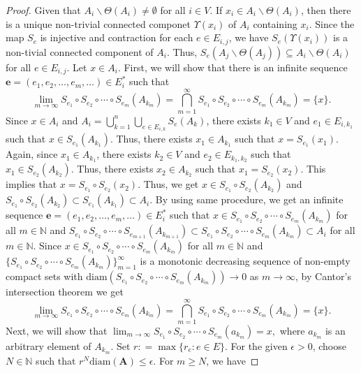\documentclass[a4paper,12pt,reqno]{amsart}
\numberwithin{equation}{section}
\theoremstyle{definition}
\theoremstyle{remark}
\numberwithin{equation}{section}
\begin{document}
\begin{proof}
Given that $A_i \backslash \Theta (A_i) \neq \emptyset$ for all $i\in V$. If $x_i \in A_i \backslash \Theta (A_i)$, then there is a unique non-trivial connected componet $\Upsilon(x_i)$ of $A_{i}$ containing $x_{i}.$ Since the map $S_{e}$ is injective and contraction for each $e\in E_{i,j}$, we have $S_e(\Upsilon(x_i))$ is a non-tivial connected component of $A_i$. Thus, $S_e(A_j \backslash \Theta (A_j))\subseteq A_i \backslash \Theta (A_i)$ for all $e\in E_{i,j}.$ Let $x\in A_i.$ First, we will show that there is an infinite sequence $\mathbf{e}=(e_1,e_2,\dots,e_m,\dots)\in E_{i}^*$ such that $$ \lim_{ m \to \infty} S_{e_1} \circ S_{e_2}\circ \cdots  \circ S_{e_m}(A_{k_m})=\bigcap_{m=1}^{\infty} S_{e_1} \circ S_{e_2}\circ \cdots  \circ S_{e_m}(A_{k_m})= \{x\}.$$ Since $x\in A_{i}$ and  $A_i=\bigcup_{k=1}^n \bigcup_{e \in E_{i,k}} S_e (A_k)$, there exists $k_{1}\in V$ and $e_{1}\in E_{i,k_1}$ such that $x\in S_{e_1}(A_{k_1}).$ Thus, there exists $x_1\in A_{k_1}$ such that $x=S_{e_1}(x_1).$ Again, since $x_1\in A_{k_1}$, there exists $k_{2}\in V$ and $e_{2}\in E_{k_1,k_2}$ such that $x_{1}\in S_{e_2}(A_{k_2}).$ Thus, there exists $x_2\in A_{k_2}$ such that $x_{1}=S_{e_2}(x_2).$ This implies that $x=S_{e_1}\circ S_{e_{2}}(x_2)$. Thus, we get $x\in S_{e_1}\circ S_{e_{2}} (A_{k_2})$ and $S_{e_1}\circ S_{e_{2}} (A_{k_2})\subset S_{e_1}(A_{k_1})\subset A_i$. By using same procedure, we get an infinite sequence $\mathbf{e}=(e_1,e_2,\dots,e_m,\dots)\in E_{i}^*$ such that $x\in S_{e_1} \circ S_{e_2}\circ \cdots  \circ S_{e_m}(A_{k_m})$ for all $m\in \mathbb{N}$ and $S_{e_1} \circ S_{e_2}\circ \cdots  \circ S_{e_{m+1}}(A_{k_{m+1}})\subset S_{e_1} \circ S_{e_2}\circ \cdots  \circ S_{e_m}(A_{k_m})\subset A_i$ for all $m\in \mathbb{N}.$ Since $x\in S_{e_1} \circ S_{e_2}\circ \cdots  \circ S_{e_m}(A_{k_m})$ for all $m\in \mathbb{N}$ and $\{S_{e_1} \circ S_{e_2}\circ \cdots  \circ S_{e_m}(A_{k_m})\}_{m=1}^{\infty}$ is a monotonic decreasing sequence of non-empty compact sets with $\text{diam}(S_{e_1} \circ S_{e_2}\circ \cdots  \circ S_{e_m}(A_{k_m}))\to 0$ as $m\to \infty$, by Cantor's intersection theorem we get $$ \lim_{ m \to \infty} S_{e_1} \circ S_{e_2}\circ \cdots  \circ S_{e_m}(A_{k_m})=\bigcap_{m=1}^{\infty} S_{e_1} \circ S_{e_2}\circ \cdots  \circ S_{e_m}(A_{k_m})= \{x\}.$$ Next, we will show that $\lim_{ m \to \infty} S_{e_1} \circ S_{e_2}\circ \cdots  \circ S_{e_m}(a_{k_m})=x,$ where $a_{k_m}$ is an arbitrary element of $A_{k_m}$. Set $r: =\max\{r_e: e\in E\}$. For the given $\epsilon >0$, choose $N\in \mathbb{N}$ such that $r^{N}\text{diam}(\mathbf{A})\leq \epsilon.$ For $m\geq N$, we have 

\end{proof}
\end{document}
